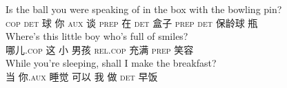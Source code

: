 \eal
\label{aux-fronting-childes}
\ex 
\gll Is the ball you were speaking of in the box with the bowling pin?\\
\textsc{cop} \textsc{det} 球 你 \textsc{aux} 谈 \textsc{prep} 在 \textsc{det} 盒子 \textsc{prep} \textsc{det} 保龄球 瓶\\
\ex 
\gll Where's          this little boy who's                     full of smiles?\\
     哪儿.\textsc{cop} 这   小     男孩 \textsc{rel}.\textsc{cop} 充满 \textsc{prep} 笑容\\
\ex\label{aux-fronting-Adjunktsatz} 
\gll While you're sleeping, shall I make the breakfast?\\
当 你.\textsc{aux} 睡觉 可以 我 做 \textsc{det} 早饭\\
\zl

